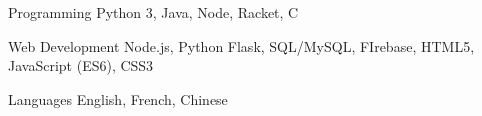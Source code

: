 

\begin{cvskills}

  \cvskill
  {Programming} %
  {Python 3, Java, Node, Racket, C} %

  \cvskill
  {Web Development} %
  {Node.js, Python Flask, SQL/MySQL, FIrebase, HTML5, JavaScript (ES6), CSS3} %

  \cvskill
  {Languages} %
  {English, French, Chinese} %

\end{cvskills}
